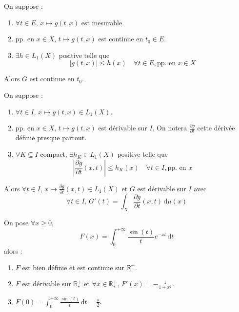   \begin{theorem}
    On suppose :
    \begin{enumerate}[label={\bfseries(\roman*)}]
      \item $\forall t \in E$, $x \mapsto g(t,x)$ est mesurable.
      \item pp. en $x \in X$, $t \mapsto g(t,x)$ est continue en $t_0 \in E$.
      \item $\exists h \in L_1(X)$ positive telle que
      \[ |g(t,x)| \leq h(x) \quad \forall t \in E, \text{pp. en } x \in X \]
    \end{enumerate}
    Alors $G$ est continue en $t_0$.
  \end{theorem}

  \begin{theorem}
    On suppose :
    \begin{enumerate}[label={\bfseries(\roman*)}]
      \item $\forall t \in I$, $x \mapsto g(t,x) \in L_1(X)$.
      \item pp. en $x \in X$, $t \mapsto g(t,x)$ est dérivable sur $I$. On notera $\frac{\partial g}{\partial t}$ cette dérivée définie presque partout.
      \item $\forall K \subseteq I$ compact, $\exists h_K \in L_1(X)$ positive telle que
      \[ \left| \frac{\partial g}{\partial t}(x,t) \right| \leq h_K(x) \quad \forall t \in I, \text{pp. en } x \]
    \end{enumerate}
    Alors $\forall t \in I$, $x \mapsto \frac{\partial g}{\partial t}(x, t) \in L_1(X)$ et $G$ est dérivable sur $I$ avec
    \[ \forall t \in I, \, G'(t) = \int_X \frac{\partial g}{\partial t}(x, t) \, \mathrm{d}\mu(x) \]
  \end{theorem}


  \begin{application}
    On pose $\forall x \geq 0$,
    \[ F(x) = \int_0^{+\infty} \frac{\sin(t)}{t} e^{-xt} \, \mathrm{d}t \]
    alors :
    \begin{enumerate}[label={\bfseries(\roman*)}]
      \item $F$ est bien définie et est continue sur $\mathbb{R}^+$.
      \item $F$ est dérivable sur $\mathbb{R}^+_*$ et $\forall x \in \mathbb{R}^+_*$, $F'(x) = -\frac{1}{1+x^2}$.
      \item $F(0) = \int_0^{+\infty} \frac{\sin(t)}{t} \, \mathrm{d}t = \frac{\pi}{2}$.
    \end{enumerate}
  \end{application}

